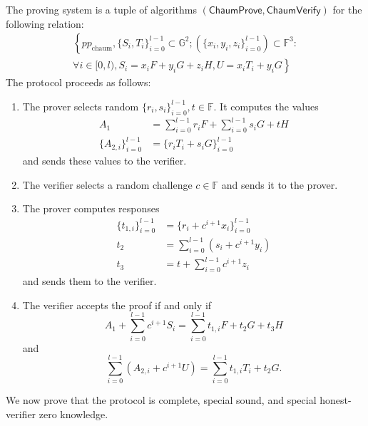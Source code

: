 \documentclass{llncs}
\newcommand{\G}{\mathbb{G}}
\newcommand{\F}{\mathbb{F}}
\newcommand{\func}[1]{\mathsf{#1}}
\begin{document}
The proving system is a tuple of algorithms $(\func{ChaumProve},\func{ChaumVerify})$ for the following relation:
\begin{multline*}
\left\{ pp_{\text{chaum}}, \{S_i, T_i\}_{i=0}^{l-1} \subset \G^2 ; (\{x_i, y_i, z_i\}_{i=0}^{l-1}) \subset \F^3 : \right. \\
\left. \forall i \in [0,l), S_i = x_i F + y_i G + z_i H, U = x_i T_i + y_i G \right\}
\end{multline*}
The protocol proceeds as follows:
\begin{enumerate}
    \item The prover selects random $\{r_i,s_i\}_{i=0}^{l-1}, t \in \F$.
    It computes the values
    \begin{align*}
        A_1 &= \sum_{i=0}^{l-1} r_i F + \sum_{i=0}^{l-1} s_i G + tH \\
        \{A_{2,i}\}_{i=0}^{l-1} &= \{r_i T_i + s_i G\}_{i=0}^{l-1}
    \end{align*}
    and sends these values to the verifier.
    \item The verifier selects a random challenge $c \in \F$ and sends it to the prover.
    \item The prover computes responses
    \begin{align*}
        \{t_{1,i}\}_{i=0}^{l-1} &= \{r_i + c^{i+1} x_i\}_{i=0}^{l-1} \\
        t_2 &= \sum_{i=0}^{l-1} (s_i + c^{i+1} y_i) \\
        t_3 &= t + \sum_{i=0}^{l-1} c^{i+1} z_i
    \end{align*}
    and sends them to the verifier.
    \item The verifier accepts the proof if and only if $$A_1 + \sum_{i=0}^{l-1} c^{i+1} S_i = \sum_{i=0}^{l-1} t_{1,i} F + t_2 G + t_3 H$$ and $$\sum_{i=0}^{l-1} (A_{2,i} + c^{i+1} U) = \sum_{i=0}^{l-1} t_{1,i} T_i + t_2 G.$$
\end{enumerate}

We now prove that the protocol is complete, special sound, and special honest-verifier zero knowledge.
\end{document}
